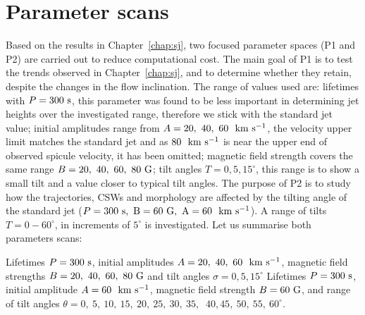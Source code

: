 \section{Parameter scans}
\label{sec:pscansII}
Based on the results in Chapter~\ref{chap:sj}, two focused parameter spaces (P1 and P2) are carried out to reduce computational cost. The main goal of P1 is to test the trends observed in Chapter~\ref{chap:sj}, and to determine whether they retain, despite the changes in the flow inclination. The range of values used are: lifetimes with $P=300~\rm{s}$, this parameter was found to be less important in determining jet heights over the investigated range, therefore we stick with the standard jet value; initial amplitudes range from $A=20,~40,~60~~\rm{km ~s^{-1}}$, the velocity upper limit matches the standard jet and as $80~~\rm{km ~s^{-1}}$ is near the upper end of observed spicule velocity, it has been omitted; magnetic field strength covers the same range $B=20,~40,~60,~80~\rm{G}$; tilt angles $T=0,5,15^{\circ}$, this range is to show a small tilt and a value closer to typical tilt angles. The purpose of P2 is to study how the trajectories, CSWs and morphology are affected by the tilting angle of the standard jet ($P=300~\rm{s}, ~B=60~\rm{G}, ~A=60~~\rm{km ~s^{-1}}$). A range of tilts $T=0-60^{\circ}$, in increments of $5^{\circ}$ is investigated. Let us summarise both parameters scans:
\begin{mylist}
\item  Lifetimes $P=300~\rm{s}$, initial amplitudes $A=20,~40,~60~~\rm{km ~s^{-1}}$, magnetic field strengths $B=20,~40,~60,~80~\rm{G}$ and tilt angles $\sigma=0,5,15^{\circ}$
\itemp Lifetimes $P=300~\rm{s}$, initial amplitude $A=60~~\rm{km ~s^{-1}}$, magnetic field strength $B=60~\rm{G}$, and range of tilt angles $\theta=0, ~5, ~10, ~15, ~20, ~25, ~30, ~35,$ $~40, 45, ~50, ~55, ~60^{\circ}$.
\end{mylist}
%
